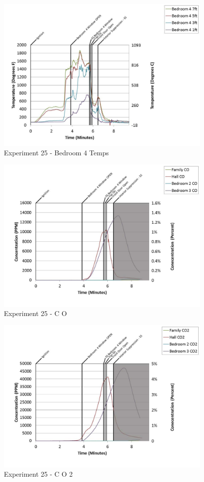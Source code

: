 \documentclass{article}
\begin{document}
\begin{appendices}
	\begin{figure}[h!]
		\centering
		\includegraphics[height=3.05in]{0_Images/Results_Charts/Exp_25_Charts/Bedroom4Temps.pdf}
		\caption{Experiment 25 - Bedroom 4 Temps}
	\end{figure}
 
	\clearpage

	\begin{figure}[h!]
		\centering
		\includegraphics[height=3.05in]{0_Images/Results_Charts/Exp_25_Charts/CO.pdf}
		\caption{Experiment 25 - C O}
	\end{figure}
 

	\begin{figure}[h!]
		\centering
		\includegraphics[height=3.05in]{0_Images/Results_Charts/Exp_25_Charts/CO2.pdf}
		\caption{Experiment 25 - C O 2}
	\end{figure}
 

\end{appendices}
\end{document}
